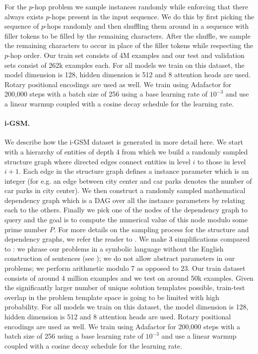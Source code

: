 




For the $p$-hop problem we sample instances randomly while enforcing that there always exists $p$-hops present in the input sequence. We do this by first picking the sequence of $p$-hops randomly and then shuffling them around in a sequence with filler tokens to be filled by the remaining characters. After the shuffle, we sample the remaining characters to occur in place of the filler tokens while respecting the $p$-hop order. Our train set consists of 4M examples and our test and validation sets consist of 262k examples each.
For all models we train on this dataset, the model dimension is 128, hidden dimension is 512 and 8 attention heads are used. Rotary positional encodings are used as well. We train using Adafactor for 200,000 steps with a batch size of 256 using a base learning rate of $10^{-3}$ and use a linear warmup coupled with a cosine decay schedule for the learning rate.


\paragraph{i-GSM.}
\label{sec:apx_igsm}
We describe how the i-GSM dataset is generated in more detail here.
We start with a hierarchy of entities of depth 4 from which we build a randomly sampled structure graph where directed edges connect entities in level $i$ to those in level $i+1$. Each edge in the structure graph defines a instance parameter which is an integer (for e.g. an edge between city center and car parks denotes the number of car parks in city center). We then construct a randomly sampled mathematical dependency graph which is a DAG over all the instance parameters by relating each to the others. Finally we pick one of the nodes of the dependency graph to query and the goal is to compute the numerical value of this node modulo some prime number $P$. For more details on the sampling process for the structure and dependency graphs, we refer the reader to \cite{ye2024physics}. We make 3 simplifications compared to \cite{ye2024physics}: we phrase our problems in a symbolic language without the English construction of sentences (see ); we do not allow abstract parameters in our problems; we perform arithmetic modulo $7$ as opposed to $23$.
Our train dataset consists of around 4 million examples and we test on around 50k examples. Given the significantly larger number of unique solution templates possible, train-test overlap in the problem template space is going to be limited with high probability. 
For all models we train on this dataset, the model dimension is 128, hidden dimension is 512 and 8 attention heads are used. Rotary positional encodings are used as well. We train using Adafactor for 200,000 steps with a batch size of 256 using a base learning rate of $10^{-3}$ and use a linear warmup coupled with a cosine decay schedule for the learning rate.


